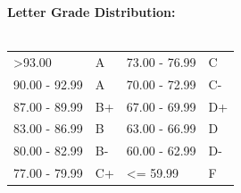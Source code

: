 \documentclass[11pt]{article}\usepackage[]{graphicx}\usepackage[]{color}
\begin{document}
\textbf {\large Letter Grade Distribution:} \\\\
\hspace*{40mm}
\begin{tabular}{ l l | l l }
 \textgreater 93.00  & A & 73.00 - 76.99 & C \\
90.00 - 92.99 & A & 70.00 - 72.99 & C- \\
87.00 - 89.99 & B+  & 67.00 - 69.99 & D+ \\
83.00 - 86.99 & B  & 63.00 - 66.99 & D \\
80.00 - 82.99 & B-  & 60.00 - 62.99 & D- \\
77.00 - 79.99 & C+  & \textless= 59.99 & F \\
\end{tabular} \\
\newpage
\end{document}
